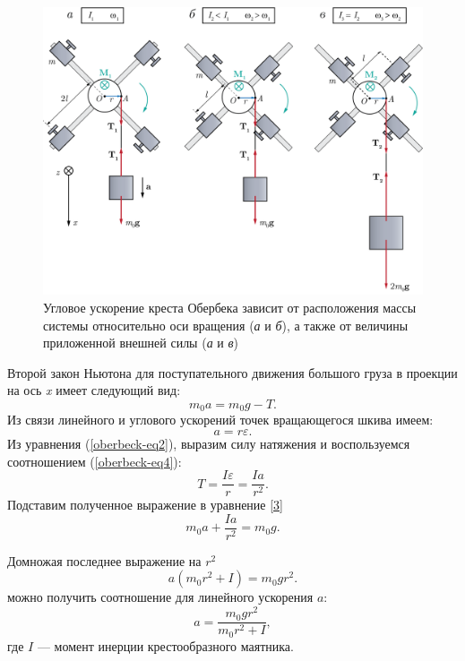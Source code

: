\documentclass[14pt,a4paper,oneside]{extarticle}	%
\begin{document}
	\begin{figure}[H] 	
	\centering 	
	\includegraphics[width=0.9\linewidth]{oberbeck-4.png}
	\caption{Угловое ускорение креста Обербека зависит от расположения массы системы относительно оси вращения (\textit{а} и \textit{б}), а также от величины приложенной внешней силы (\textit{а} и \textit{в})}
	\label{oberbeck-4}
\end{figure}
	
	Второй закон Ньютона для поступательного движения большого груза в проекции на ось \textit{x} имеет следующий вид:
	\begin{equation}\label{oberbeck-eq3}
	m_0a = m_0g - T.
	\end{equation}
	Из связи линейного и углового ускорений точек вращающегося шкива имеем:
	\begin{equation}\label{oberbeck-eq4}
	a = r\varepsilon.
	\end{equation}
	Из уравнения (\ref{oberbeck-eq2}), выразим силу натяжения и воспользуемся соотношением (\ref{oberbeck-eq4}):
	\begin{equation}\label{oberbeck-eq5}
	T = \frac{I\varepsilon}{r} = \frac{Ia}{r^{2}}.
	\end{equation}
	Подставим полученное выражение в уравнение \ref{3}
	\begin{equation}\label{oberbeck-eq6}
	m_0a + \frac{Ia}{r^{2}} = m_0g.
	\end{equation}
	
	Домножая последнее выражение на $ r^{2} $
	\begin{equation}\label{oberbeck-eq7}
	a(m_0r^{2} + I) = m_0gr^{2}.
	\end{equation}
	можно получить соотношение для линейного ускорения $ a $:
		\begin{equation}\label{oberbeck-eq8}
	a = \frac{m_0gr^{2}}{m_0r^{2} + I},
	\end{equation}
	где $ I $ — момент инерции крестообразного маятника.
	
\end{document}
